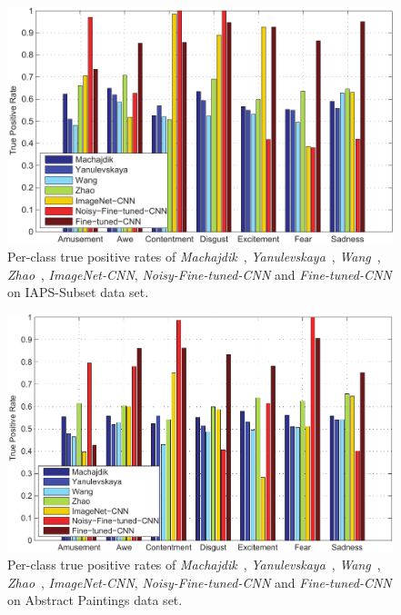 \documentclass[letterpaper]{article}
\begin{document}

\begin{figure}[!t]
\begin{center}
\includegraphics[width=.45\textwidth]{./iaps_new-crop}
\end{center}
\caption{Per-class true positive rates of \textit{Machajdik}~\cite{machajdik2010affective}, \textit{Yanulevskaya}~\cite{yanulevskaya2008emotional}, \textit{Wang}~\cite{wei2006image}, \textit{Zhao}~\cite{zhou2014learning}, \textit{ImageNet-CNN}, \textit{Noisy-Fine-tuned-CNN} and \textit{Fine-tuned-CNN} on IAPS-Subset data set.}
\label{fig:iaps}
\end{figure}

\begin{figure}[!t]
\begin{center}
\includegraphics[width=.45\textwidth]{./abstract_new-crop}
\end{center}
\caption{Per-class true positive rates of \textit{Machajdik}~\cite{machajdik2010affective}, \textit{Yanulevskaya}~\cite{yanulevskaya2008emotional}, \textit{Wang}~\cite{wei2006image}, \textit{Zhao}~\cite{zhou2014learning}, \textit{ImageNet-CNN}, \textit{Noisy-Fine-tuned-CNN} and \textit{Fine-tuned-CNN} on Abstract Paintings data set.}
\label{fig:abstract}
\end{figure}
\end{document}
